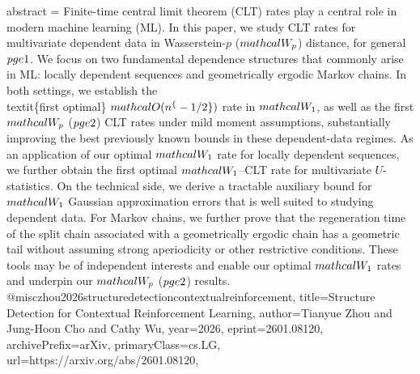 {      abstract = {Finite-time central limit theorem (CLT) rates play a central role in modern machine learning (ML). In this paper, we study CLT rates for multivariate dependent data in Wasserstein-$p$ ($\\mathcal W_p$) distance, for general $p\\ge 1$. We focus on two fundamental dependence structures that commonly arise in ML: locally dependent sequences and geometrically ergodic Markov chains. In both settings, we establish the \\textit\{first optimal\} $\\mathcal O(n^\{-1/2\})$ rate in $\\mathcal W_1$, as well as the first $\\mathcal W_p$ ($p\\ge 2$) CLT rates under mild moment assumptions, substantially improving the best previously known bounds in these dependent-data regimes. As an application of our optimal $\\mathcal W_1$ rate for locally dependent sequences, we further obtain the first optimal $\\mathcal W_1$--CLT rate for multivariate $U$-statistics.   On the technical side, we derive a tractable auxiliary bound for $\\mathcal W_1$ Gaussian approximation errors that is well suited to studying dependent data. For Markov chains, we further prove that the regeneration time of the split chain associated with a geometrically ergodic chain has a geometric tail without assuming strong aperiodicity or other restrictive conditions. These tools may be of independent interests and enable our optimal $\\mathcal W_1$ rates and underpin our $\\mathcal W_p$ ($p\\ge 2$) results.}
}@misc{zhou2026structuredetectioncontextualreinforcement,
      title={Structure Detection for Contextual Reinforcement Learning}, 
      author={Tianyue Zhou and Jung-Hoon Cho and Cathy Wu},
      year={2026},
      eprint={2601.08120},
      archivePrefix={arXiv},
      primaryClass={cs.LG},
      url={https://arxiv.org/abs/2601.08120},
}
